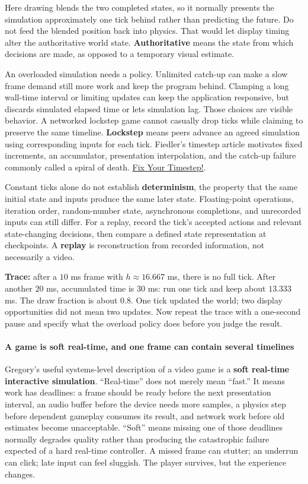 Here drawing blends the two completed states, so it normally presents the simulation approximately one tick behind rather than predicting the future. Do not feed the blended position back into physics. That would let display timing alter the authoritative world state. \textbf{Authoritative} means the state from which decisions are made, as opposed to a temporary visual estimate.

An overloaded simulation needs a policy. Unlimited catch-up can make a slow frame demand still more work and keep the program behind. Clamping a long wall-time interval or limiting updates can keep the application responsive, but discards simulated elapsed time or lets simulation lag. Those choices are visible behavior. A networked lockstep game cannot casually drop ticks while claiming to preserve the same timeline. \textbf{Lockstep} means peers advance an agreed simulation using corresponding inputs for each tick. Fiedler's timestep article motivates fixed increments, an accumulator, presentation interpolation, and the catch-up failure commonly called a spiral of death. \href{https://gafferongames.com/post/fix_your_timestep/}{Fix Your Timestep!}.

Constant ticks alone do not establish \textbf{determinism}, the property that the same initial state and inputs produce the same later state. Floating-point operations, iteration order, random-number state, asynchronous completions, and unrecorded inputs can still differ. For a replay, record the tick's accepted actions and relevant state-changing decisions, then compare a defined state representation at checkpoints. A \textbf{replay} is reconstruction from recorded information, not necessarily a video.

\textbf{Trace:} after a \(10\) ms frame with \(h\approx16.667\) ms, there is no full tick. After another \(20\) ms, accumulated time is \(30\) ms: run one tick and keep about \(13.333\) ms. The draw fraction is about \(0.8\). One tick updated the world; two display opportunities did not mean two updates. Now repeat the trace with a one-second pause and specify what the overload policy does before you judge the result.

\paragraph{A game is soft real-time, and one frame can contain several timelines}\label{a-game-is-soft-real-time-and-one-frame-can-contain-several-timelines}

Gregory's useful systems-level description of a video game is a \textbf{soft real-time interactive simulation}. ``Real-time'' does not merely mean ``fast.'' It means work has deadlines: a frame should be ready before the next presentation interval, an audio buffer before the device needs more samples, a physics step before dependent gameplay consumes its result, and network work before old estimates become unacceptable. ``Soft'' means missing one of those deadlines normally degrades quality rather than producing the catastrophic failure expected of a hard real-time controller. A missed frame can stutter; an underrun can click; late input can feel sluggish. The player survives, but the experience changes.

